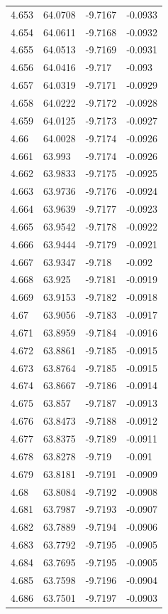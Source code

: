 \begin{tabular}{llll}
4.653 & 64.0708 & -9.7167 & -0.0933 \\
4.654 & 64.0611 & -9.7168 & -0.0932 \\
4.655 & 64.0513 & -9.7169 & -0.0931 \\
4.656 & 64.0416 & -9.717 & -0.093 \\
4.657 & 64.0319 & -9.7171 & -0.0929 \\
4.658 & 64.0222 & -9.7172 & -0.0928 \\
4.659 & 64.0125 & -9.7173 & -0.0927 \\
4.66 & 64.0028 & -9.7174 & -0.0926 \\
4.661 & 63.993 & -9.7174 & -0.0926 \\
4.662 & 63.9833 & -9.7175 & -0.0925 \\
4.663 & 63.9736 & -9.7176 & -0.0924 \\
4.664 & 63.9639 & -9.7177 & -0.0923 \\
4.665 & 63.9542 & -9.7178 & -0.0922 \\
4.666 & 63.9444 & -9.7179 & -0.0921 \\
4.667 & 63.9347 & -9.718 & -0.092 \\
4.668 & 63.925 & -9.7181 & -0.0919 \\
4.669 & 63.9153 & -9.7182 & -0.0918 \\
4.67 & 63.9056 & -9.7183 & -0.0917 \\
4.671 & 63.8959 & -9.7184 & -0.0916 \\
4.672 & 63.8861 & -9.7185 & -0.0915 \\
4.673 & 63.8764 & -9.7185 & -0.0915 \\
4.674 & 63.8667 & -9.7186 & -0.0914 \\
4.675 & 63.857 & -9.7187 & -0.0913 \\
4.676 & 63.8473 & -9.7188 & -0.0912 \\
4.677 & 63.8375 & -9.7189 & -0.0911 \\
4.678 & 63.8278 & -9.719 & -0.091 \\
4.679 & 63.8181 & -9.7191 & -0.0909 \\
4.68 & 63.8084 & -9.7192 & -0.0908 \\
4.681 & 63.7987 & -9.7193 & -0.0907 \\
4.682 & 63.7889 & -9.7194 & -0.0906 \\
4.683 & 63.7792 & -9.7195 & -0.0905 \\
4.684 & 63.7695 & -9.7195 & -0.0905 \\
4.685 & 63.7598 & -9.7196 & -0.0904 \\
4.686 & 63.7501 & -9.7197 & -0.0903 \\

\end{tabular}
